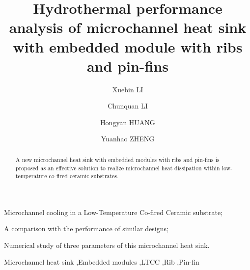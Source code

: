 \documentclass[preprint,5p,sort&compress,times,10pt]{elsarticle} %
\begin{document}

\begin{frontmatter}


    \title{Hydrothermal performance analysis of microchannel heat sink with embedded module with ribs and pin-fins}

    \author[rvt]{Xuebin LI}
    \author[rvt]{Chunquan LI}
    \author[rvt]{Hongyan HUANG}%
    \author[rvt]{Yuanhao ZHENG}%




    \begin{abstract}
        A new microchannel heat sink with embedded modules with ribs and pin-fins is proposed as an effective solution to realize microchannel heat dissipation within low-temperature co-fired ceramic substrates.
    \end{abstract}



    \begin{highlights}
        \item Microchannel cooling in a Low-Temperature Co-fired Ceramic substrate;
        \item A comparison with the performance of similar designs;
        \item Numerical study of three parameters of this microchannel heat sink.
    \end{highlights}

    \begin{keyword}
        Microchannel heat sink \sep Embedded modules \sep LTCC \sep Rib \sep Pin-fin
    \end{keyword}

\end{frontmatter}
\end{document}

